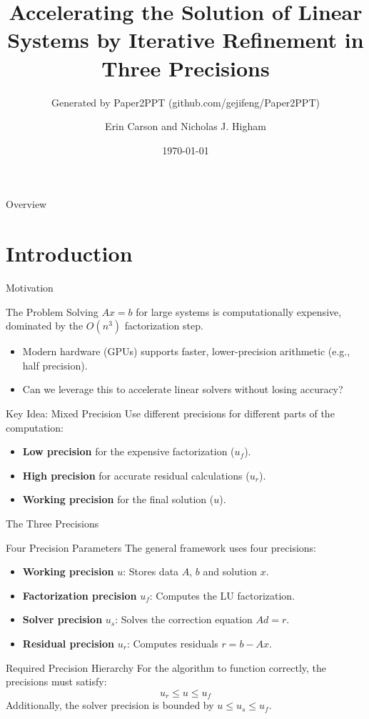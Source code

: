 \documentclass[
	11pt,
	aspectratio=169,
]{beamer}
\title[Accelerating the Sol...]{Accelerating the Solution of Linear Systems by Iterative Refinement in Three Precisions}
\subtitle{Generated by Paper2PPT (github.com/gejifeng/Paper2PPT)}
\author{Erin Carson and Nicholas J. Higham}
\date{\today}
\begin{document}
\begin{frame}
	\titlepage
\end{frame}
\begin{frame}{Overview}
	\tableofcontents
\end{frame}



\section{Introduction}


\begin{frame}{Motivation}
    \begin{block}{The Problem}
Solving $A x = b$ for large systems is computationally expensive, dominated by the $O(n^3)$ factorization step.
\end{block}

\begin{itemize}
    \item Modern hardware (GPUs) supports faster, lower-precision arithmetic (e.g., half precision).
    \item Can we leverage this to accelerate linear solvers without losing accuracy?
\end{itemize}

\begin{block}{Key Idea: Mixed Precision}
Use different precisions for different parts of the computation:
\begin{itemize}
    \item \textbf{Low precision} for the expensive factorization ($u_f$).
    \item \textbf{High precision} for accurate residual calculations ($u_r$).
    \item \textbf{Working precision} for the final solution ($u$).
\end{itemize}
\end{block}
\end{frame}
\begin{frame}{The Three Precisions}
    \begin{block}{Four Precision Parameters}
The general framework uses four precisions:
\begin{itemize}
    \item \textbf{Working precision} $u$: Stores data $A$, $b$ and solution $x$.
    \item \textbf{Factorization precision} $u_f$: Computes the LU factorization.
    \item \textbf{Solver precision} $u_s$: Solves the correction equation $A d = r$.
    \item \textbf{Residual precision} $u_r$: Computes residuals $r = b - A x$.
\end{itemize}
\end{block}

\begin{block}{Required Precision Hierarchy}
For the algorithm to function correctly, the precisions must satisfy:
\begin{equation*}
u_r \leq u \leq u_f
\end{equation*}
Additionally, the solver precision is bounded by $u \leq u_s \leq u_f$.
\end{block}
\end{frame}
\end{document}
